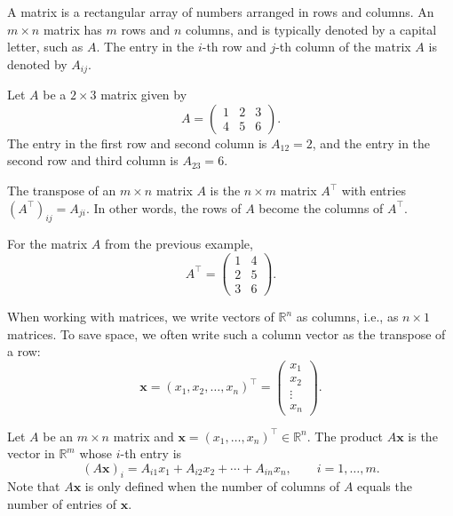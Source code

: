\begin{definition}[Matrix]
    A matrix is a rectangular array of numbers arranged in rows and columns. An $m \times n$ matrix has $m$ rows and $n$ columns, and is typically denoted by a capital letter, such as $A$. The entry in the $i$-th row and $j$-th column of the matrix $A$ is denoted by $A_{ij}$.
\end{definition}

\begin{example}
    Let $A$ be a $2 \times 3$ matrix given by
    \[A = \begin{pmatrix}
        1 & 2 & 3 \\
        4 & 5 & 6
    \end{pmatrix}.\]
    The entry in the first row and second column is $A_{12} = 2$, and the entry in the second row and third column is $A_{23} = 6$.
\end{example}

\begin{definition}[Transpose]
    The transpose of an $m \times n$ matrix $A$ is the $n \times m$ matrix $A^\top$ with entries $(A^\top)_{ij} = A_{ji}$. In other words, the rows of $A$ become the columns of $A^\top$.
\end{definition}

\begin{example}
    For the matrix $A$ from the previous example,
    \[A^\top = \begin{pmatrix}
        1 & 4 \\
        2 & 5 \\
        3 & 6
    \end{pmatrix}.\]
\end{example}

When working with matrices, we write vectors of $\mathbb{R}^n$ as columns, i.e., as $n \times 1$ matrices. To save space, we often write such a column vector as the transpose of a row:
\[\mathbf{x} = (x_1, x_2, \ldots, x_n)^\top = \begin{pmatrix}
    x_1 \\
    x_2 \\
    \vdots \\
    x_n
\end{pmatrix}.\]

\begin{definition}
    Let $A$ be an $m \times n$ matrix and $\mathbf{x} = (x_1, \ldots, x_n)^\top \in \mathbb{R}^n$. The product $A\mathbf{x}$ is the vector in $\mathbb{R}^m$ whose $i$-th entry is
    \[(A\mathbf{x})_i = A_{i1} x_1 + A_{i2} x_2 + \cdots + A_{in} x_n, \qquad i = 1, \ldots, m.\]
    Note that $A\mathbf{x}$ is only defined when the number of columns of $A$ equals the number of entries of $\mathbf{x}$.
\end{definition}

